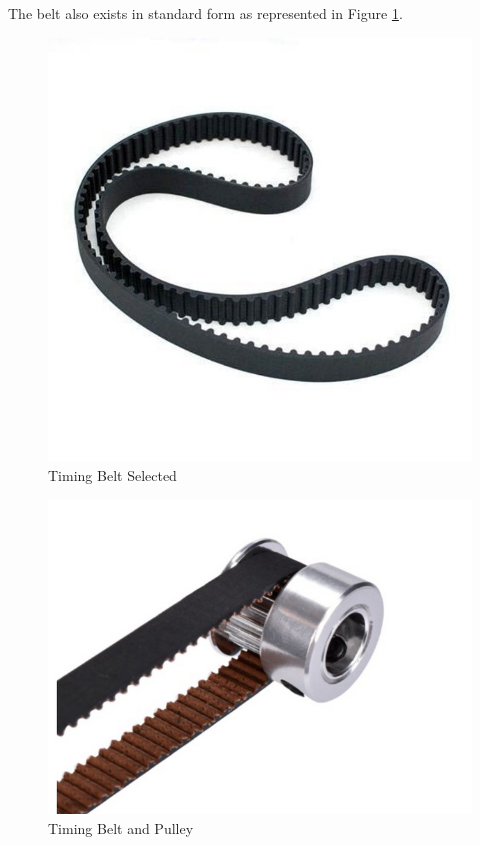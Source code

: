 The belt also exists in standard form as represented in Figure \ref{fig:timingBelt}. 
\begin{figure}[H]
    \centering
    \includegraphics[scale = 0.35]{Figures/timingBelt.jpg}
    \caption{Timing Belt Selected}
    \label{fig:timingBelt}
\end{figure}

\begin{figure}[H]
    \centering
    \includegraphics[scale = 0.4]{Figures/beltPulley.jpg}
    \caption{Timing Belt and Pulley}
    \label{fig:beltPulley}
\end{figure}

